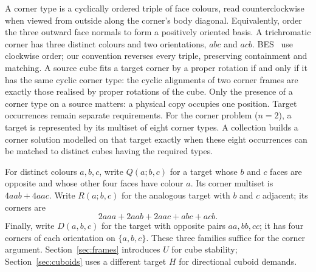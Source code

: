 \documentclass[11pt]{article}
\theoremstyle{remark}
\begin{document}
A corner type is a cyclically ordered triple of face colours, read
counterclockwise when viewed from outside along the corner's body diagonal.
Equivalently, order the three outward face normals to form a positively
oriented basis. A trichromatic corner has three distinct colours and two
orientations, $abc$ and $acb$. BES~\cite[Section 2]{BES} use clockwise order; our convention
reverses every triple, preserving containment and matching. A source cube
fits a target corner by a proper rotation if and
only if it has the same cyclic corner type: the cyclic alignments of two
corner frames are exactly those realised by proper rotations of the cube.
Only the presence of a corner type on a source matters: a physical copy
occupies one position. Target occurrences remain separate requirements.
For the corner problem ($n=2$), a target is represented by its multiset of
eight corner types. A collection builds a corner solution modelled on that
target exactly when these eight occurrences can be matched to distinct
cubes having the required types.

For distinct colours $a,b,c$, write $Q(a;b,c)$ for a target whose $b$ and $c$
faces are opposite and whose other four faces have colour $a$. Its corner multiset is
$4aab+4aac$. Write $R(a;b,c)$ for the analogous target with $b$ and $c$
adjacent; its corners are
\[
  2aaa+2aab+2aac+abc+acb.
\]
Finally, write $D(a,b,c)$ for the target with opposite pairs $aa,bb,cc$;
it has four corners of each orientation on $\{a,b,c\}$. These three families suffice for the corner argument. Section~\ref{sec:frames}
introduces $U$ for cube stability; Section~\ref{sec:cuboids} uses a different
target $H$ for directional cuboid demands.
\end{document}
